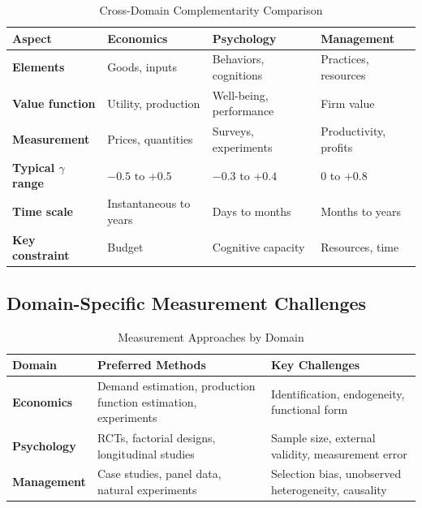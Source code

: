 \begin{table}[h]
\centering
\caption{Cross-Domain Complementarity Comparison}
\label{tab:cross-domain}
\renewcommand{\arraystretch}{1.3}
\small
\begin{tabular}{@{}p{2.5cm}p{3.5cm}p{3.5cm}p{3.5cm}@{}}
\toprule
\textbf{Aspect} & \textbf{Economics} & \textbf{Psychology} & \textbf{Management} \\
\midrule
\textbf{Elements} & Goods, inputs & Behaviors, cognitions & Practices, resources \\
\textbf{Value function} & Utility, production & Well-being, performance & Firm value \\
\textbf{Measurement} & Prices, quantities & Surveys, experiments & Productivity, profits \\
\textbf{Typical $\gamma$ range} & $-0.5$ to $+0.5$ & $-0.3$ to $+0.4$ & $0$ to $+0.8$ \\
\textbf{Time scale} & Instantaneous to years & Days to months & Months to years \\
\textbf{Key constraint} & Budget & Cognitive capacity & Resources, time \\
\bottomrule
\end{tabular}
\end{table}

\subsection{Domain-Specific Measurement Challenges}

\begin{table}[h]
\centering
\caption{Measurement Approaches by Domain}
\label{tab:measurement}
\renewcommand{\arraystretch}{1.3}
\small
\begin{tabular}{@{}p{2.5cm}p{4.5cm}p{5cm}@{}}
\toprule
\textbf{Domain} & \textbf{Preferred Methods} & \textbf{Key Challenges} \\
\midrule
\textbf{Economics} & Demand estimation, production function estimation, experiments & Identification, endogeneity, functional form \\
\textbf{Psychology} & RCTs, factorial designs, longitudinal studies & Sample size, external validity, measurement error \\
\textbf{Management} & Case studies, panel data, natural experiments & Selection bias, unobserved heterogeneity, causality \\
\bottomrule
\end{tabular}
\end{table}

